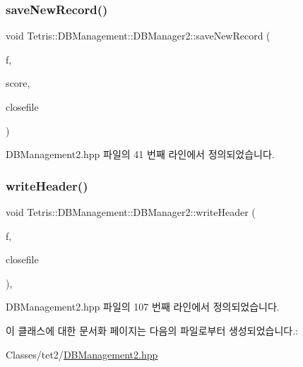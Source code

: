 \mbox{\label{class_tetris_1_1_d_b_management_1_1_d_b_manager2_a25da0c1a6fa64b669f7e793c846961db}} 
\subsubsection{\texorpdfstring{save\+New\+Record()}{saveNewRecord()}}
{\footnotesize\ttfamily void Tetris\+::\+D\+B\+Management\+::\+D\+B\+Manager2\+::save\+New\+Record (\begin{DoxyParamCaption}\item[{F\+I\+LE $\ast$$\ast$}]{f,  }\item[{unsigned long long}]{score,  }\item[{bool}]{closefile }\end{DoxyParamCaption})\hspace{0.3cm}{\ttfamily [inline]}}



D\+B\+Management2.\+hpp 파일의 41 번째 라인에서 정의되었습니다.

\mbox{\label{class_tetris_1_1_d_b_management_1_1_d_b_manager2_af814ba59852fbb4f3630149454c2d312}} 
\subsubsection{\texorpdfstring{write\+Header()}{writeHeader()}}
{\footnotesize\ttfamily void Tetris\+::\+D\+B\+Management\+::\+D\+B\+Manager2\+::write\+Header (\begin{DoxyParamCaption}\item[{F\+I\+LE $\ast$$\ast$}]{f,  }\item[{bool}]{closefile }\end{DoxyParamCaption})\hspace{0.3cm}{\ttfamily [inline]}, {\ttfamily [protected]}}



D\+B\+Management2.\+hpp 파일의 107 번째 라인에서 정의되었습니다.



이 클래스에 대한 문서화 페이지는 다음의 파일로부터 생성되었습니다.\+:\begin{DoxyCompactItemize}
\item 
Classes/tet2/\hyperlink{_d_b_management2_8hpp}{D\+B\+Management2.\+hpp}\end{DoxyCompactItemize}
